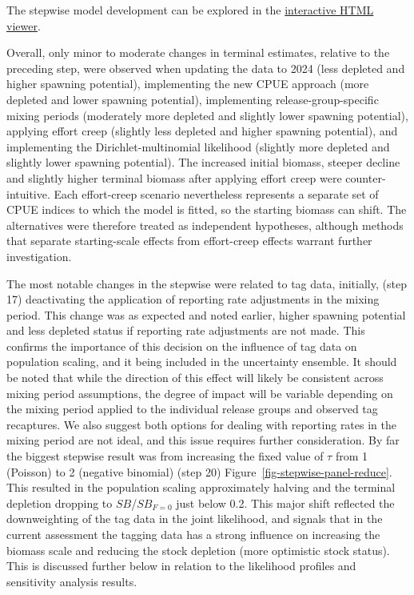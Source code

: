 \documentclass[
  english,
  a4paper,
  a4paper,
  11pt]{SCreport}
\begin{document}
The stepwise model development can be explored in the
\href{https://pacificcommunity.github.io/ofp-sam-bet-2026-stepwise/interactive-model-viewer.html}{interactive
HTML viewer}.

Overall, only minor to moderate changes in terminal estimates, relative
to the preceding step, were observed when updating the data to 2024
(less depleted and higher spawning potential), implementing the new CPUE
approach (more depleted and lower spawning potential), implementing
release-group-specific mixing periods (moderately more depleted and
slightly lower spawning potential), applying effort creep (slightly less
depleted and higher spawning potential), and implementing the
Dirichlet-multinomial likelihood (slightly more depleted and slightly
lower spawning potential). The increased initial biomass, steeper
decline and slightly higher terminal biomass after applying effort creep
were counter-intuitive. Each effort-creep scenario nevertheless
represents a separate set of CPUE indices to which the model is fitted,
so the starting biomass can shift. The alternatives were therefore
treated as independent hypotheses, although methods that separate
starting-scale effects from effort-creep effects warrant further
investigation.

The most notable changes in the stepwise were related to tag data,
initially, (step 17) deactivating the application of reporting rate
adjustments in the mixing period. This change was as expected and noted
earlier, higher spawning potential and less depleted status if reporting
rate adjustments are not made. This confirms the importance of this
decision on the influence of tag data on population scaling, and it
being included in the uncertainty ensemble. It should be noted that
while the direction of this effect will likely be consistent across
mixing period assumptions, the degree of impact will be variable
depending on the mixing period applied to the individual release groups
and observed tag recaptures. We also suggest both options for dealing
with reporting rates in the mixing period are not ideal, and this issue
requires further consideration. By far the biggest stepwise result was
from increasing the fixed value of \(\tau\) from 1 (Poisson) to 2
(negative binomial) (step 20) Figure~\ref{fig-stepwise-panel-reduce}.
This resulted in the population scaling approximately halving and the
terminal depletion dropping to \(SB\)/\(SB_{F=0}\) just below 0.2. This
major shift reflected the downweighting of the tag data in the joint
likelihood, and signals that in the current assessment the tagging data
has a strong influence on increasing the biomass scale and reducing the
stock depletion (more optimistic stock status). This is discussed
further below in relation to the likelihood profiles and sensitivity
analysis results.
\end{document}
